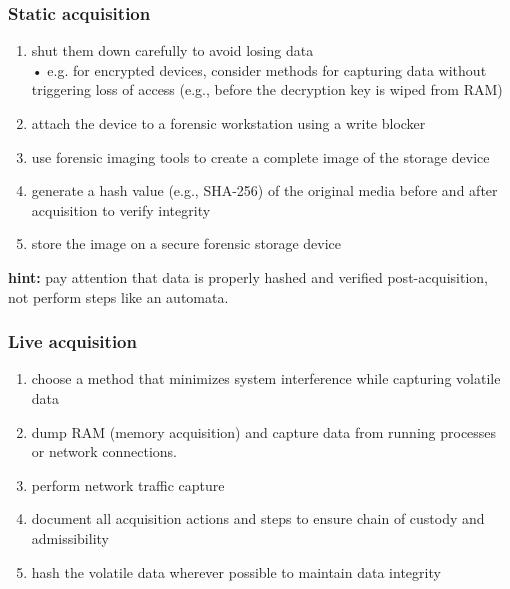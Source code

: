 \subsubsection{Static acquisition}
\begin{enumerate}
  \item shut them down carefully to avoid losing data \\
    • e.g. for encrypted devices, consider methods for capturing data without triggering loss of access (e.g., before the decryption key is wiped from RAM)
  \item attach the device to a forensic workstation using a write blocker
  \item use forensic imaging tools to create a complete image of the storage device
  \item generate a hash value (e.g., SHA-256) of the original media before and after acquisition to verify integrity
  \item store the image on a secure forensic storage device
\end{enumerate}
\textbf{hint:} pay attention that data is properly hashed and verified post-acquisition, not perform steps like an automata.

\subsubsection{Live acquisition}
\begin{enumerate}
  \item choose a method that minimizes system interference while capturing volatile data
  \item dump RAM (memory acquisition) and capture data from running processes or network connections.
  \item perform network traffic capture
  \item document all acquisition actions and steps to ensure chain of custody and admissibility
  \item hash the volatile data wherever possible to maintain data integrity
\end{enumerate}

